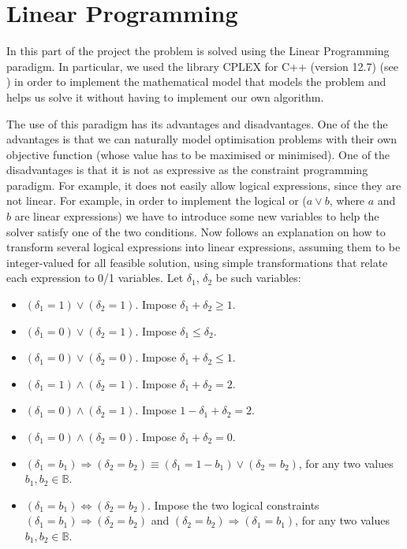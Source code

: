 \section{Linear Programming}
\label{sec:linear-programming}

In this part of the project the problem is solved using the Linear Programming
paradigm. In particular, we used the library CPLEX for C++ (version 12.7)
(see \cite{CplexWEB}) in order to implement the mathematical model that models
the problem and helps us solve it without having to implement our own algorithm.

\hfill

The use of this paradigm has its advantages and disadvantages.
One of the the advantages is that we can naturally model optimisation problems
with their own objective function (whose value has to be maximised or minimised).
One of the disadvantages is that it is not as expressive as the constraint
programming paradigm. For example, it does not easily allow logical expressions,
since they are not linear. For example, in order to implement the
logical or ($a \vee b$, where $a$ and $b$ are linear expressions) we have to
introduce some new variables to help the solver satisfy one of the two conditions.
Now follows an explanation on how to transform several logical expressions into
linear expressions, assuming them to be integer-valued for all feasible solution,
using simple transformations that relate each expression to 0/1 variables. Let
$\delta_1$, $\delta_2$ be such variables:

\begin{itemize}	
	\item $(\delta_1 = 1) \vee (\delta_2 = 1)$. Impose $\delta_1 + \delta_2 \ge 1$.
	
	\item $(\delta_1 = 0) \vee (\delta_2 = 1)$.	Impose $\delta_1 \le \delta_2$.
	
	\item $(\delta_1 = 0) \vee (\delta_2 = 0)$.	Impose $\delta_1 + \delta_2 \le 1$.
	
	\item $(\delta_1 = 1) \wedge (\delta_2 = 1)$. Impose $\delta_1 + \delta_2 = 2$.
	
	\item $(\delta_1 = 0) \wedge (\delta_2 = 1)$. Impose $1 - \delta_1 + \delta_2 = 2$.	
	
	\item $(\delta_1 = 0) \wedge (\delta_2 = 0)$. Impose $\delta_1 + \delta_2 = 0$.
	
	\item $(\delta_1 = b_1) \Longrightarrow (\delta_2 = b_2) \equiv (\delta_1 = 1 - b_1) \vee (\delta_2 = b_2)$,
	for any two values $b_1,b_2 \in \mathbb{B}$.
	
	\item $(\delta_1 = b_1) \Longleftrightarrow (\delta_2 = b_2)$. Impose the two logical constraints
	$(\delta_1 = b_1) \Longrightarrow (\delta_2 = b_2)$ and $(\delta_2 = b_2) \Longrightarrow (\delta_1 = b_1)$,
	for any two values $b_1,b_2 \in \mathbb{B}$.
	
\end{itemize}

